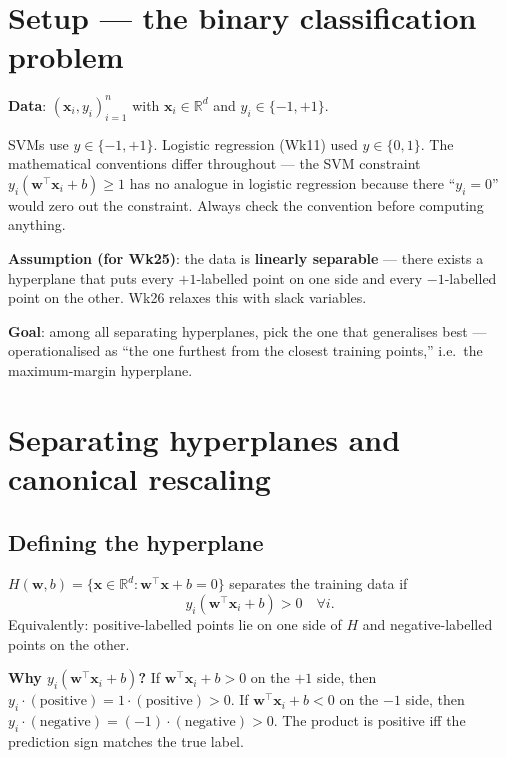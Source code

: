 \documentclass[11pt, a4paper]{article}
\begin{document}
\section{Setup --- the binary classification problem}

\textbf{Data}: $(\mathbf{x}_i, y_i)_{i=1}^n$ with $\mathbf{x}_i \in \mathbb{R}^d$ and $y_i \in \{-1, +1\}$.

\begin{pitfallbox}[: $\{-1, +1\}$ vs $\{0, 1\}$]
SVMs use $y \in \{-1, +1\}$. Logistic regression (Wk11) used $y \in \{0, 1\}$. The mathematical conventions differ throughout — the SVM constraint $y_i(\mathbf{w}^\top\mathbf{x}_i + b) \ge 1$ has no analogue in logistic regression because there ``$y_i = 0$'' would zero out the constraint. Always check the convention before computing anything.
\end{pitfallbox}

\textbf{Assumption (for Wk25)}: the data is \textbf{linearly separable} — there exists a hyperplane that puts every $+1$-labelled point on one side and every $-1$-labelled point on the other. Wk26 relaxes this with slack variables.

\textbf{Goal}: among all separating hyperplanes, pick the one that generalises best — operationalised as ``the one furthest from the closest training points,'' i.e.\ the maximum-margin hyperplane.

\section{Separating hyperplanes and canonical rescaling}

\subsection{Defining the hyperplane}

\begin{defbox}
$H(\mathbf{w}, b) = \{\mathbf{x}\in\mathbb{R}^d : \mathbf{w}^\top\mathbf{x} + b = 0\}$ separates the training data if
\[
y_i(\mathbf{w}^\top\mathbf{x}_i + b) > 0 \quad \forall i.
\]
Equivalently: positive-labelled points lie on one side of $H$ and negative-labelled points on the other.
\end{defbox}

\textbf{Why $y_i(\mathbf{w}^\top\mathbf{x}_i + b)$?} If $\mathbf{w}^\top\mathbf{x}_i + b > 0$ on the $+1$ side, then $y_i \cdot (\text{positive}) = 1\cdot(\text{positive}) > 0$. If $\mathbf{w}^\top\mathbf{x}_i + b < 0$ on the $-1$ side, then $y_i \cdot (\text{negative}) = (-1)\cdot(\text{negative}) > 0$. The product is positive iff the prediction sign matches the true label.
\end{document}
